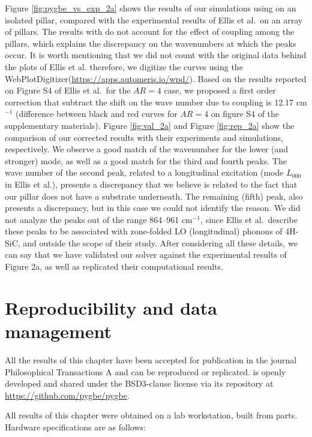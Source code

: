 Figure \ref{fig:pygbe_vs_exp_2a} shows the results of our simulations using \pygbe on an isolated pillar, compared with the experimental results
of Ellis et al.\ on an array of pillars. The results with \pygbe do not account for the effect of coupling among the pillars, which explains the  
discrepancy on the wavenumbers at which the peaks occur. It is worth mentioning that we did not count with the original data behind the plots of 
Ellis et al. therefore, we digitize the curves using the WebPlotDigitizer(\url{https://apps.automeris.io/wpd/}). Based on the results reported 
on Figure S4 of Ellis et al.\ for the $AR=4$ case, we proposed a first order correction that subtract the shift on the wave number due to
coupling is 12.17 cm$^{-1}$ (difference between black and red curves for $AR=4$ on figure S4 of the supplementary materials). Figure \ref{fig:val_2a}
and Figure \ref{fig:rep_2a} show the comparison of our corrected results with their experiments and simulations, respectively. We observe a good match 
of the wavenumber for the lower (and stronger) mode, as well as a good match for the third and fourth peaks. The wave number of the second peak, related 
to a longitudinal excitation (mode $L_{000}$ in Ellis et al.), presents a discrepancy that we believe is related to the fact that our 
pillar does not have a substrate underneath. The remaining (fifth) peak, also presents a discrepancy, but in this case we could not identify the reason.
We did not analyze the peaks out of the range 864--961 cm$^{-1}$, since Ellis et al.\ describe these peaks to be associated with 
zone-folded LO (longitudinal) phonons of 4H-SiC, and outside the scope of their study.
After considering all these details, we can say that we have validated our solver \pygbe against the experimental results of 
Figure 2a, as well as replicated their computational results.

\section{Reproducibility and data management} \label{sec:repro_val}
 
All the results of this chapter have been accepted for publication in the journal 
Philosophical Transactions A \cite{ClementiBarba2020} and can be reproduced or replicated. \pygbe is openly developed and 
shared under the BSD3-clause license via its repository at \url{https://github.com/pygbe/pygbe}.

All results of this chapter were obtained on a lab workstation, built from parts. Hardware specifications are as follows:

